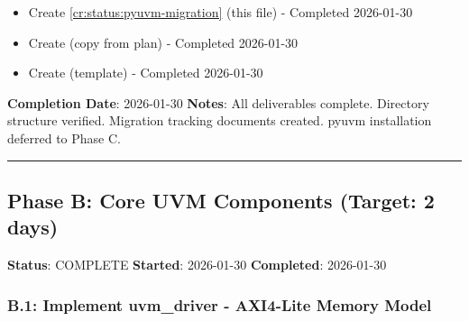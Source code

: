 \begin{record}

\begin{itemize}
\tightlist
\item[$\boxtimes$]
  Create \cref{cr:status:pyuvm-migration} (this file) -
  Completed 2026-01-30
\item[$\boxtimes$]
  Create  (copy from plan)
  - Completed 2026-01-30
\item[$\boxtimes$]
  Create  (template) -
  Completed 2026-01-30
\end{itemize}

\textbf{Completion Date}: 2026-01-30 \textbf{Notes}: All deliverables
complete. Directory structure verified. Migration tracking documents
created. pyuvm installation deferred to Phase C.

\begin{center}\rule{0.5\linewidth}{0.5pt}\end{center}

\end{record}

\subsection{Phase B: Core UVM Components (Target: 2 days)}\label{cr:status:pyuvm-migration:phase-b-core-uvm-components-target-2-days}

\begin{record}

\textbf{Status}: \ok{} COMPLETE \textbf{Started}: 2026-01-30
\textbf{Completed}: 2026-01-30

\end{record}

\subsubsection{\texorpdfstring{B.1: Implement uvm\_\allowbreak{}driver -
AXI4-Lite Memory
Model}{B.1: Implement uvm\_driver - AXI4-Lite Memory Model}}\label{cr:status:pyuvm-migration:b1-implement-uvm-driver-axi4-lite-memory-model}


